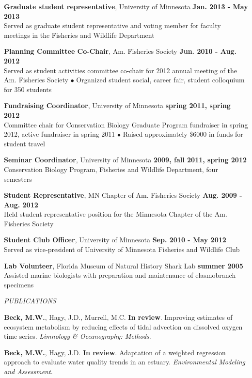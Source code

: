 \documentclass[letterpaper,12pt]{article}
\newcommand{\sectitle}[1]{\vspace{\baselineskip} \centerline{\large{\textit{#1}}}}
\begin{document}
{\bf Graduate student representative}, University of Minnesota \hfill {\bf Jan. 2013 - May 2013} \\
Served as graduate student representative and voting member for faculty meetings in the Fisheries and Wildlife Department

{\bf Planning Committee Co-Chair}, Am. Fisheries Society \hfill {\bf Jun. 2010 - Aug. 2012} \\
Served as student activities committee co-chair for 2012 annual meeting of the Am. Fisheries Society $\bullet$ Organized student social, career fair, student colloquium for 350 students

{\bf Fundraising Coordinator}, University of Minnesota \hfill {\bf spring 2011, spring 2012} \\
Committee chair for Conservation Biology Graduate Program fundraiser in spring 2012, active fundraiser in spring 2011 $\bullet$ Raised approximately \$6000 in funds for student travel

{\bf Seminar Coordinator}, University of Minnesota \hfill {\bf 2009, fall 2011, spring 2012} \\
Conservation Biology Program, Fisheries and Wildlife Department, four semesters

{\bf Student Representative}, MN Chapter of Am. Fisheries Society \hfill {\bf Aug. 2009 - Aug. 2012} \\
Held student representative position for the Minnesota Chapter of the Am. Fisheries Society

{\bf Student Club Officer}, University of Minnesota \hfill {\bf Sep. 2010 - May 2012} \\
Served as vice-president of University of Minnesota Fisheries and Wildlife Club

{\bf Lab Volunteer}, Florida Museum of Natural History Shark Lab \hfill {\bf summer 2005} \\
Assisted marine biologists with preparation and maintenance of elasmobranch specimens

\sectitle{PUBLICATIONS}

\textbf{Beck, M.W.}, Hagy, J.D., Murrell, M.C. {\bf In review}. Improving estimates of ecosystem metabolism by reducing effects of tidal advection on dissolved oxygen time series. \textit{Limnology & Oceanography: Methods}.

\textbf{Beck, M.W.}, Hagy, J.D. {\bf In review}. Adaptation of a weighted regression approach to evaluate water quality trends in an estuary. \textit{Environmental Modeling and Assessment}.
\end{document}
